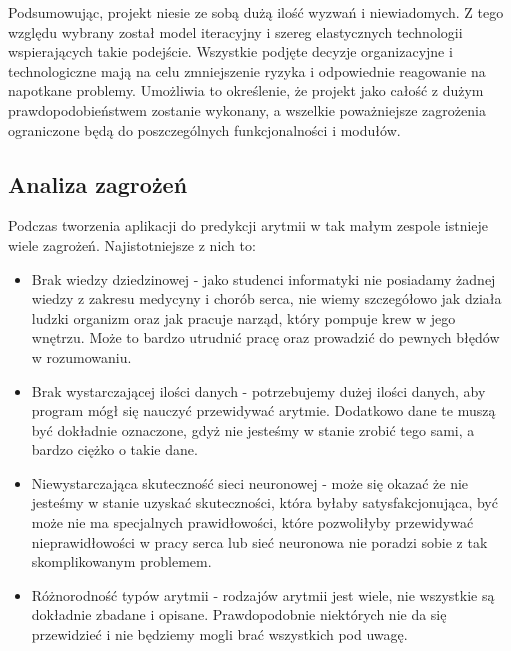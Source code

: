 \documentclass[polish,12pt]{aghthesis}
\begin{document}
Podsumowując, projekt niesie ze sobą dużą ilość wyzwań i niewiadomych. Z tego względu wybrany został model iteracyjny i szereg elastycznych technologii wspierających takie podejście. Wszystkie podjęte decyzje organizacyjne i technologiczne mają na celu zmniejszenie ryzyka i odpowiednie reagowanie na napotkane problemy. Umożliwia to określenie, że projekt jako całość z dużym prawdopodobieństwem zostanie wykonany, a wszelkie poważniejsze zagrożenia ograniczone będą do poszczególnych funkcjonalności i modułów.

\subsection{Analiza zagrożeń}

Podczas tworzenia aplikacji do predykcji arytmii w tak małym zespole istnieje wiele zagrożeń. Najistotniejsze z nich to:

\begin{itemize}
\item Brak wiedzy dziedzinowej - jako studenci informatyki nie posiadamy żadnej wiedzy z zakresu medycyny i chorób serca, nie wiemy szczegółowo jak działa ludzki organizm oraz jak pracuje narząd, który pompuje krew w jego wnętrzu. Może to bardzo utrudnić pracę oraz prowadzić do pewnych błędów w rozumowaniu.

\item Brak wystarczającej ilości danych - potrzebujemy dużej ilości danych, aby program mógł się nauczyć przewidywać arytmie. Dodatkowo dane te muszą być dokładnie oznaczone, gdyż nie jesteśmy w stanie zrobić tego sami, a bardzo ciężko o takie dane.

\item Niewystarczająca skuteczność sieci neuronowej - może się okazać że nie jesteśmy w stanie uzyskać skuteczności, która byłaby satysfakcjonująca, być może nie ma specjalnych prawidłowości, które pozwoliłyby przewidywać nieprawidłowości w pracy serca lub sieć neuronowa nie poradzi sobie z tak skomplikowanym problemem.

\item Różnorodność typów arytmii - rodzajów arytmii jest wiele, nie wszystkie są dokładnie zbadane i opisane. Prawdopodobnie niektórych nie da się przewidzieć i nie będziemy mogli brać wszystkich pod uwagę.
\end{itemize}
\end{document}
